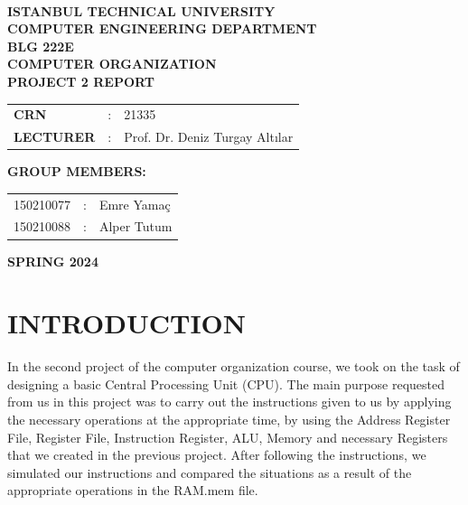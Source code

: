 \documentclass[pdftex,12pt,a4paper]{article}
\begin{document}
\begin{titlepage}
\begin{center}
\textbf{}\\
\textbf{\Large{ISTANBUL TECHNICAL UNIVERSITY}}\\
\vspace{0.5cm}
\textbf{\Large{COMPUTER ENGINEERING DEPARTMENT}}\\
\vspace{4cm}
\textbf{\Large{BLG 222E\\ COMPUTER ORGANIZATION\\ PROJECT 2 REPORT}}\\
\vspace{4cm}
\begin{table}[ht]
\centering
\Large{
\begin{tabular}{lcl}
\textbf{CRN}  & : & 21335 \\
\textbf{LECTURER}  & : & Prof. Dr. Deniz Turgay Altılar \\
\end{tabular}}
\end{table}
\vspace{1cm}
\textbf{\Large{GROUP MEMBERS:}}\\
\begin{table}[ht]
\centering
\Large{
\begin{tabular}{rcl}
150210077  & : & Emre Yamaç \\
150210088  & : & Alper Tutum \\
\end{tabular}}
\end{table}
\vspace{2.8cm}
\textbf{\Large{SPRING 2024}}

\end{center}

\end{titlepage}

\thispagestyle{empty}
\setcounter{tocdepth}{4}
\tableofcontents
\clearpage

\setcounter{page}{1}

\section{INTRODUCTION}
In the second project of the computer organization course, we took on the task of designing a basic Central Processing Unit (CPU). The main purpose requested from us in this project was to carry out the instructions given to us by applying the necessary operations at the appropriate time, by using the Address Register File, Register File, Instruction Register, ALU, Memory and necessary Registers that we created in the previous project. After following the instructions, we simulated our instructions and compared the situations as a result of the appropriate operations in the RAM.mem file.
\end{document}
